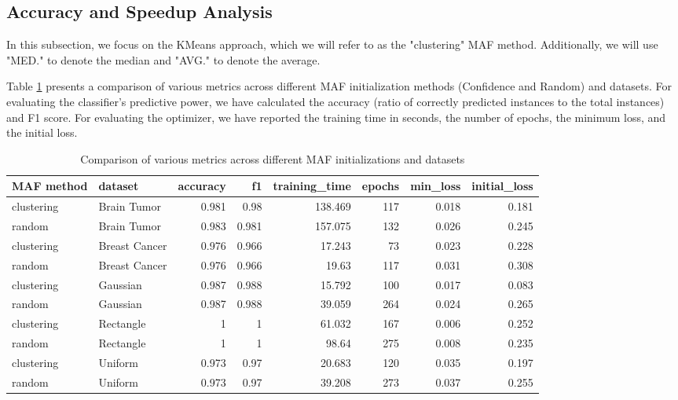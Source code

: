 \documentclass[10pt,a4paper,oneside]{article}
\begin{document}
\subsection{Accuracy and Speedup Analysis}
In this subsection, we focus on the KMeans approach, which we will refer to as the "clustering" MAF method. Additionally, we will use "MED." to denote the median and "AVG." to denote the average.

Table \ref{comparison} presents a comparison of various metrics across different MAF initialization methods (Confidence and Random) and datasets. For evaluating the classifier's predictive power, we have calculated the accuracy (ratio of correctly predicted instances to the total instances) and F1 score. For evaluating the optimizer, we have reported the training time in seconds, the number of epochs, the minimum loss, and the initial loss.

\begin{table}[H]
    \centering
    \caption{Comparison of various metrics across different MAF initializations and datasets}
    \label{comparison}
    \begin{tabular}{l|l|r|r|r|r|r|r}
    \toprule
    MAF method & dataset & accuracy & f1 & training\_time & epochs & min\_loss & initial\_loss\\
    \midrule
    clustering & Brain Tumor & 0.981 & 0.98 & 138.469 & 117 & 0.018 & 0.181 \\
    random & Brain Tumor & 0.983 & 0.981 & 157.075 & 132 & 0.026 & 0.245 \\
    clustering & Breast Cancer & 0.976 & 0.966 & 17.243 & 73 & 0.023 & 0.228 \\
    random & Breast Cancer & 0.976 & 0.966 & 19.63 & 117 & 0.031 & 0.308 \\
    clustering & Gaussian & 0.987 & 0.988 & 15.792 & 100 & 0.017 & 0.083 \\
    random & Gaussian & 0.987 & 0.988 & 39.059 & 264 & 0.024 & 0.265 \\
    clustering & Rectangle & 1 & 1 & 61.032 & 167 & 0.006 & 0.252  \\
    random & Rectangle & 1 & 1 & 98.64 & 275 & 0.008 & 0.235 \\
    clustering & Uniform & 0.973 & 0.97 & 20.683 & 120 & 0.035 & 0.197  \\
    random & Uniform & 0.973 & 0.97 & 39.208 & 273 & 0.037 & 0.255 \\
        \bottomrule
    \end{tabular}
\end{table}
\end{document}
